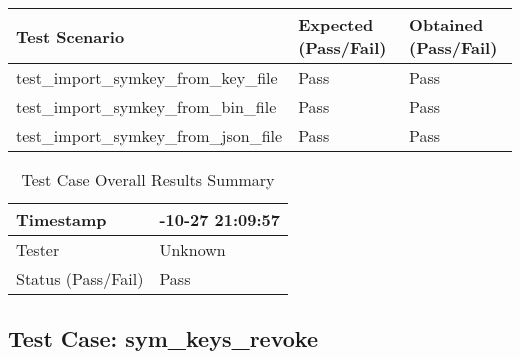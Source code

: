 \documentclass[a4paper,12pt]{article}
\begin{document}
\begin{table}[h]
    \centering
    \begin{tabularx}{1\textwidth}{ 
      | >{\raggedright\arraybackslash}X   
      | p{2.5cm}                            
      | p{2.5cm} |}                         
        \hline
        \textbf{Test Scenario} & \textbf{Expected (Pass/Fail)} & \textbf{Obtained (Pass/Fail)} \\  
        \hline

test\_import\_symkey\_from\_key\_file & Pass & Pass \\
\hline

test\_import\_symkey\_from\_bin\_file & Pass & Pass \\
\hline

test\_import\_symkey\_from\_json\_file & Pass & Pass \\
\hline

    \end{tabularx}
\end{table}

    \begin{table}[h]
        \centering
        \begin{tabularx}{1\textwidth}{ 
          | >{\raggedright\arraybackslash}X 
          | >{\raggedright\arraybackslash}X | }
            \hline
            Timestamp & 2024-10-27 21:09:57 \\
            \hline
            Tester & Unknown \\
            \hline
            \rowcolor{green!30} %
            Status (Pass/Fail) & Pass \\
            \hline
        \end{tabularx}
        \caption{Test Case Overall Results Summary}
        \label{tab:test_case_info}
    \end{table}

    \newpage
    
\subsection{Test Case: sym\_keys\_revoke}
\end{document}
